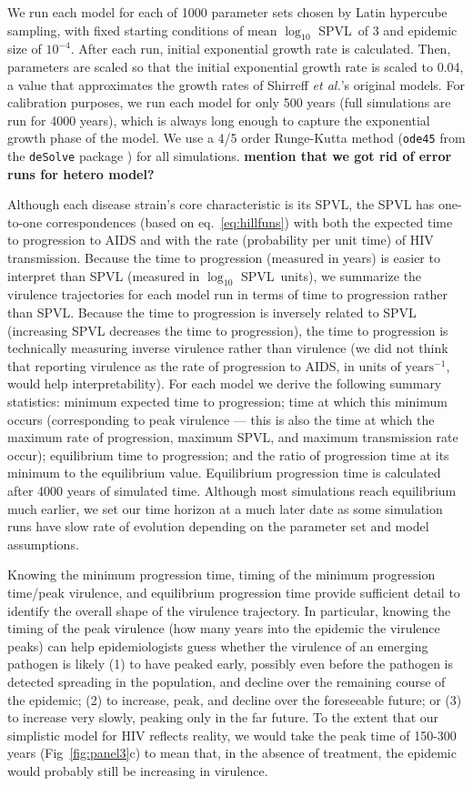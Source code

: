 \documentclass[10pt,letterpaper]{article}
\renewcommand{\figurename}{Fig}
\newcommand{\Lspvl}{$\log_{10}$ SPVL}
\newcommand{\etal}{\textit{et al.}}
\newcommand{\todo}[1]{\textbf{#1}}
\begin{document}
We run each model for each of 1000 parameter sets chosen by Latin hypercube sampling, with fixed starting conditions
of mean \Lspvl\ of 3 and epidemic size of $10^{-4}$. After each run, initial exponential growth rate is calculated. Then, parameters are scaled so that the initial exponential growth rate is scaled to 0.04, a value that approximates the growth rates of Shirreff \etal's original models.
For calibration purposes, we run each model for only 500 years
(full simulations are run for 4000 years), which is always long
enough to capture the exponential growth phase of the model. 
We use a 4/5 order 
Runge-Kutta method (\texttt{ode45} from the \texttt{deSolve} package
\cite{soetaert_solving_2010}) for all simulations. \todo{mention that we got rid of error runs for hetero model?}

Although each disease strain's core characteristic is its SPVL, the
SPVL has one-to-one correspondences (based on eq.~\ref{eq:hillfuns})
with both the expected time to progression to AIDS and with the rate
(probability per unit time) of HIV transmission. Because the time to
progression (measured in years) is easier to interpret than
SPVL (measured in \Lspvl\ units), we summarize the virulence
trajectories for each model run in terms of time to progression
rather than SPVL. Because the  time to progression is inversely
related to SPVL (increasing SPVL decreases the time to progression),
the time to progression is technically measuring inverse
virulence rather than virulence (we did not think that 
reporting virulence as the rate of progression to AIDS, in units
of $\textrm{years}^{-1}$, would help interpretability).
For each model we derive the following summary statistics:
minimum expected time to progression;
time at which this minimum occurs
(corresponding to peak virulence --- this is also the time at which the
maximum rate of progression, maximum SPVL, and maximum transmission rate
occur); equilibrium time to progression; 
and the ratio of progression time at its minimum to the equilibrium
value. Equilibrium progression time is calculated after 4000 years of simulated
time. Although most simulations reach equilibrium much earlier, we set our time horizon at a much later date as some simulation runs have slow rate of evolution depending on the parameter set and model assumptions.

Knowing the minimum progression time, timing of the minimum progression time/peak virulence, and equilibrium progression time provide sufficient detail to identify the overall shape of the virulence trajectory.
In particular, knowing the timing of the peak virulence (how many years
into the epidemic the virulence peaks) can help epidemiologists
guess whether the virulence of an emerging pathogen is likely (1)
to have peaked early, possibly even before the pathogen is detected
spreading in the population, and decline over the remaining course
of the epidemic; (2) to increase, peak, and decline over the
foreseeable future; or (3) to increase very slowly, peaking only
in the far future. To the extent that our simplistic model for HIV
reflects reality, we would take the peak time of 150-300 years 
(\figurename~\ref{fig:panel3}c) to mean that, in the absence of
treatment, the epidemic would probably still be increasing in virulence.
\end{document}
